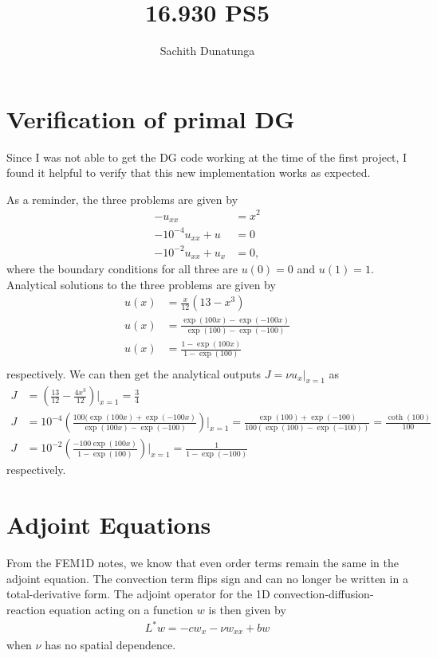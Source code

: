 \documentclass{article}
\begin{document}
\author{Sachith Dunatunga}
\title{16.930 PS5}
\maketitle

\section{Verification of primal DG}

Since I was not able to get the DG code working at the time of the first project, I found it helpful to verify that this new implementation works as expected.

As a reminder, the three problems are given by
\begin{align}
-u_{xx} &= x^2 \\
-10^{-4} u_{xx} + u &= 0 \\
-10^{-2} u_{xx} + u_x &= 0,
\end{align}
where the boundary conditions for all three are $u(0) = 0$ and $u(1) = 1$.
Analytical solutions to the three problems are given by
\begin{align}
u(x) &= \frac{x}{12} \left( 13 - x^3 \right) \\
u(x) &= \frac{\exp(100x) - \exp(-100x)}{\exp(100) - \exp(-100)} \\
u(x) &= \frac{1 - \exp(100x)}{1 - \exp(100)}\\
\end{align}
respectively.
We can then get the analytical outputs $J = \nu u_x \rvert_{x=1}$ as
\begin{align}
J &= \left(\frac{13}{12} - \frac{4x^3}{12} \right) \biggr\rvert_{x=1} = \frac{3}{4} \\
J &= 10^{-4} \left( \frac{100 (\exp(100x) + \exp(-100x)}{\exp(100x) - \exp(-100)}\right) \biggr\rvert_{x=1} = \frac{\exp(100) + \exp(-100)}{100 (\exp(100) - \exp(-100))} = \frac{\coth(100)}{100} \\
J &= 10^{-2} \left( \frac{-100 \exp(100x)}{1 - \exp(100)}\right) \biggr\rvert_{x=1} = \frac{1}{1 - \exp(-100)}
\end{align}
respectively.

\section{Adjoint Equations}
From the FEM1D notes, we know that even order terms remain the same in the adjoint equation.
The convection term flips sign and can no longer be written in a total-derivative form.
The adjoint operator for the 1D convection-diffusion-reaction equation acting on a function $w$ is then given by
\begin{align}
L^*w = -c w_x - \nu w_{xx} + b w
\end{align}
when $\nu$ has no spatial dependence.

\section{}
\end{document}
